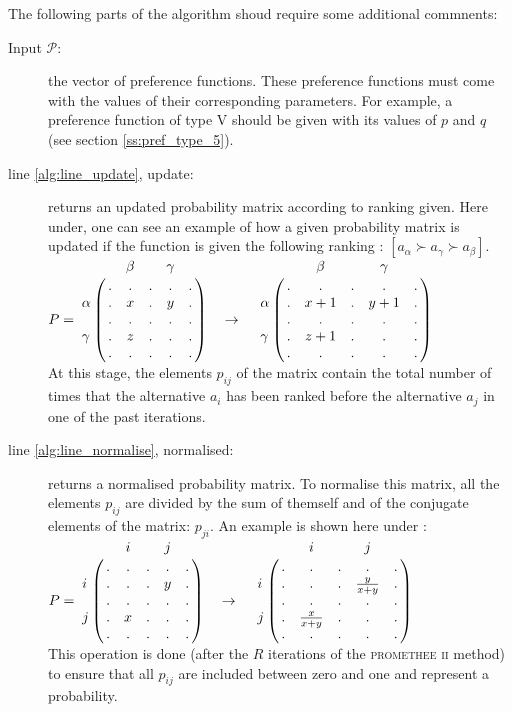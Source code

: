 The following parts of the algorithm shoud require some additional commnents:
\begin{description}
    \item[Input $\mathcal{P} :$] the vector of preference functions. These preference functions must come with the values of their corresponding parameters. 
        For example, a preference function of type V should be given with its values of $p$ and $q$ (see section \ref{ss:pref_type_5}).
    \item[line \ref{alg:line_update}, update:] returns an updated probability matrix according to ranking given. 
        Here under, one can see an example of how a given probability matrix is updated if the function is given the following ranking : $[ a_\alpha \succ a_\gamma \succ a_\beta ]$.\\
        \vskip 0.5cm
        {
        $P= \bordermatrix{ & & \beta  & & \gamma &\cr 
                          &. & . & . & . &.\cr
                   \alpha & . & x  & . & y & . \cr 
                          & . & .  & . & . & .\cr
                   \gamma & . & z  & . & . & .\cr 
                          &.  & .  & . & . & . \cr
        } \quad
        \rightarrow \quad \bordermatrix{ &  & \beta  & & \gamma &\cr
                      & . & .    & . & .   &.\cr
               \alpha & . & x+1  & . & y+1 & . \cr 
                      & . & .    & . & .   & .\cr
               \gamma & . & z+1  & . & .   & .\cr 
                      &.  & .    & . & .   & . \cr
                  }$}\\
        \vskip 0.5cm
        At this stage, the elements $p_{ij}$ of the matrix contain the total number of times that the alternative $a_i$ has been ranked before the alternative $a_j$ in one of the past iterations.
    \item[line \ref{alg:line_normalise}, normalised:] returns a normalised probability matrix.
        To normalise this matrix, all the elements $p_{ij}$ are divided by the sum of themself and of the conjugate elements of the matrix: $p_{ji}$. 
        An example is shown here under :\\
        \vskip 0.25cm
    $P= \bordermatrix{ & & i  & & j &\cr 
                      &. & .   & . & . &.\cr
               i      & . & .  & . & y & . \cr 
                      & . & .  & . & . & .\cr
               j      & . & x  & . & . & .\cr 
                      &.  & .  & . & . & . \cr
        } \quad 
        \rightarrow \quad \bordermatrix{ & & i  & & j &\cr 
                      &. & .   & . & . &.\cr
               i      & . & .  & . & \frac{y}{x+y} & . \cr 
                      & . & .  & . & . & .\cr
                      j      & . & \frac{x}{x+y} & . & . & .\cr 
                      &.  & .  & . & . & . \cr
        }$ \\

        \vskip 0.5cm
        This operation is done (after the $R$ iterations of the \textsc{promethee ii} method) to ensure that all $p_{ij}$ are included between zero and one and represent a probability.
\end{description}
